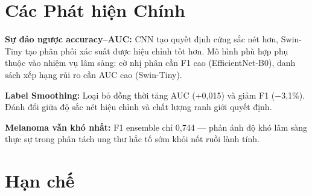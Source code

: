 \section{Các Phát hiện Chính}

\textbf{Sự đảo ngược accuracy--AUC:} CNN tạo quyết định cứng sắc nét hơn, Swin-Tiny tạo phân phối xác suất được hiệu chỉnh tốt hơn. Mô hình phù hợp phụ thuộc vào nhiệm vụ lâm sàng: cờ nhị phân cần F1 cao (EfficientNet-B0), danh sách xếp hạng rủi ro cần AUC cao (Swin-Tiny).

\textbf{Label Smoothing:} Loại bỏ đồng thời tăng AUC (+0,015) và giảm F1 ($-$3,1\%). Đánh đổi giữa độ sắc nét hiệu chỉnh và chất lượng ranh giới quyết định.

\textbf{Melanoma vẫn khó nhất:} F1 ensemble chỉ 0,744 --- phản ánh độ khó lâm sàng thực sự trong phân tách ung thư hắc tố sớm khỏi nốt ruồi lành tính.

\section{Hạn chế}


